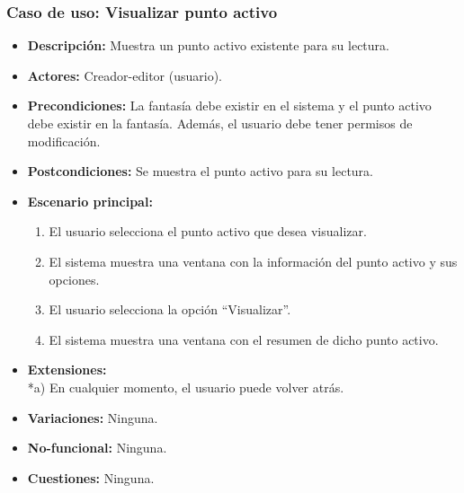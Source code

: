 \subsubsection{Caso de uso: Visualizar punto activo}
\begin{itemize}
	\item \textbf{Descripción:} Muestra un punto activo existente para su lectura.
	\item \textbf{Actores:} Creador-editor (usuario).
	\item \textbf{Precondiciones:} La fantasía debe existir en el sistema y el punto activo debe existir en la fantasía. Además, el usuario debe tener permisos de modificación.
	\item \textbf{Postcondiciones:} Se muestra el punto activo para su lectura.
	\item \textbf{Escenario principal:}
	\begin{enumerate}
		\item El usuario selecciona el punto activo que desea visualizar.
		\item El sistema muestra una ventana con la información del punto activo y sus opciones.
		\item El usuario selecciona la opción ``Visualizar''.
		\item El sistema muestra una ventana con el resumen de dicho punto activo.
	\end{enumerate}
	\item \textbf{Extensiones:} \\ *a) En cualquier momento, el usuario puede volver atrás.
	\item \textbf{Variaciones:} Ninguna.
	\item \textbf{No-funcional:} Ninguna.
	\item \textbf{Cuestiones:} Ninguna.
\end{itemize}

